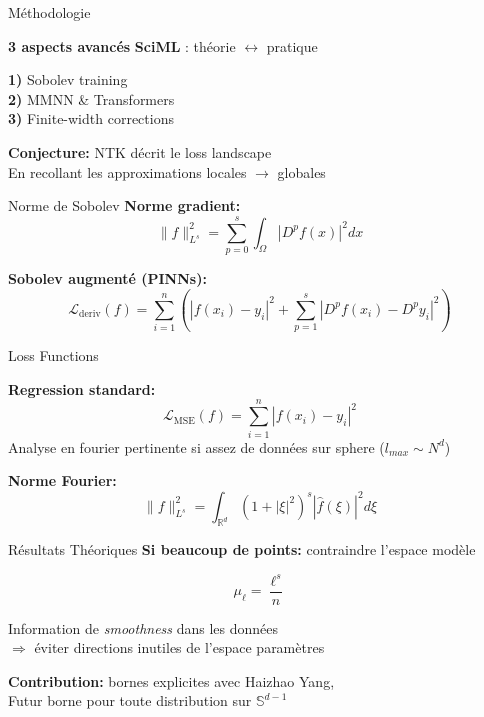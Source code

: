 \documentclass{beamer}
\begin{document}
\begin{frame}{Méthodologie}
\begin{center}
\textbf{3 aspects avancés}
\textbf{SciML} : théorie $\leftrightarrow$ pratique

\textbf{1)} Sobolev training\\
\textbf{2)} MMNN \& Transformers\\
\textbf{3)} Finite-width corrections

\vspace{1cm}

\textbf{Conjecture:} NTK décrit le loss landscape\\
En recollant les approximations locales $\rightarrow$ globales
\end{center}
\end{frame}


\begin{frame}{Norme de Sobolev}
\textbf{Norme gradient:}
\begin{equation}
\|f\|_{L^s}^2 = \sum_{p=0}^s \int_{\Omega} |D^p f(x)|^2 dx
\end{equation}


\textbf{Sobolev augmenté (PINNs):}
$$\mathcal{L}_{\text{deriv}}(f) = \sum_{i=1}^{n} \left(|f(x_i) - y_i|^2 + \sum_{p=1}^s |D^p f(x_i) - D^p y_i|^2\right)$$



\end{frame}

\begin{frame}{Loss Functions}


\textbf{Regression standard:}
$$\mathcal{L}_{\text{MSE}}(f) = \sum_{i=1}^{n} |f(x_i) - y_i|^2$$
Analyse en fourier pertinente si assez de données sur sphere ($l_{max} \sim N^d$)

\textbf{Norme Fourier:}
\begin{equation}
\|f\|_{L^s}^2 = \int_{\mathbb{R}^d} (1 + |\xi|^2)^s |\hat{f}(\xi)|^2 d\xi
\end{equation}

\end{frame}



\begin{frame}{Résultats Théoriques}
    \textbf{Si beaucoup de points:} contraindre l'espace modèle
    
    $$\mu_\ell = \frac{\ell^s}{n}$$
    
    \vspace{0.5cm}
    
    Information de \textit{smoothness} dans les données\\
    $\Rightarrow$ éviter directions inutiles de l'espace paramètres
    
    \vspace{0.5cm}
    
    \textbf{Contribution:} bornes explicites avec Haizhao Yang, \\
    Futur borne pour toute distribution sur $\mathbb{S}^{d-1}$
\end{frame}
\end{document}
